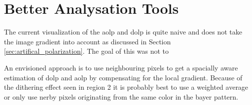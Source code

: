 \section{Better Analysation Tools}
\label{sec:better_analysation_tools}
The current visualization of the \gls{aolp} and \gls{dolp} is quite naive and does not take the image gradient into account as discussed in Section \ref{sec:artifical_polarization}.
The goal of this \master was not to


An envisioned approach is to use neighbouring pixels to get a spacially aware estimation of \gls{dolp} and \gls{aolp} by compensating for the local gradient.
Because of the dithering effect seen in region 2 it is probably best to use a weighted average or only use nerby pixels originating from the same color in the bayer pattern.